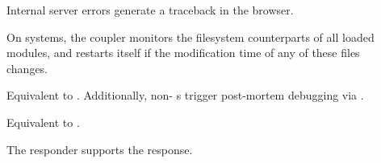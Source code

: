 \begin{description}

\item[]
    Internal server errors generate a traceback in the browser.

    On \UNIX{} systems, the  coupler monitors the filesystem
    counterparts of all loaded modules, and restarts itself if the modification
    time of any of these files changes.

\item[]
    Equivalent to . Additionally, non-
    s trigger post-mortem debugging via
    .

\item[]
    Equivalent to .

\item[]
    The  responder supports the 
    response.

\end{description}
